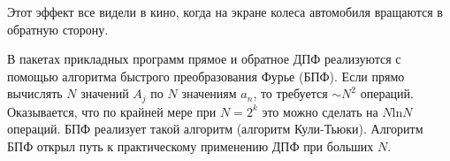 Этот эффект все видели в кино, когда на экране колеса автомобиля вращаются в обратную сторону.

В пакетах прикладных программ прямое и обратное ДПФ реализуются с помощью алгоритма быстрого преобразования Фурье (БПФ). Если прямо вычислять $N$ значений $A_j$ по $N$ значениям $a_n$, то требуется $\sim N^2$ операций. Оказывается, что по крайней мере при $N = 2^k$ это можно сделать на $N \mathrm{ln}N$ операций. БПФ реализует такой алгоритм (алгоритм Кули-Тьюки). Алгоритм БПФ открыл путь к практическому применению ДПФ при больших $N$.